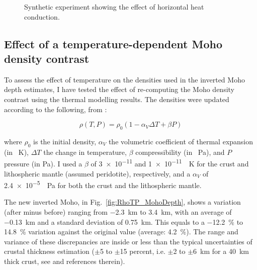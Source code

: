 \begin{subappendices}
\begin{figure}
	\begin{adjustbox}{center}
	\end{adjustbox}
	\caption[Synthetic experiment showing the effect of horizontal heat conduction.]{Synthetic experiment showing the effect of horizontal heat conduction.}
	\label{fig:2Deff}
\end{figure}

\FloatBarrier

\subsection{Effect of a temperature-dependent Moho density contrast}
\label{ss:ApplSup:MethodTests:MohoDeltaRho}

To assess the effect of temperature on the densities used in the inverted Moho depth estimates, I have tested the effect of re-computing the Moho density contrast using the thermal modelling results.
The densities were updated according to the following, from \textcite{allen2013basin}:

\begin{equation*}
    \rho(T,P) = \rho_0 (1 - \alpha_V \Delta T + \beta P) 
\end{equation*}

where $\rho_0$ is the initial density, $\alpha_V$ the volumetric coefficient of thermal expansion (in \si{\per \kelvin}), $\Delta T$ the change in temperature, $\beta$ compressibility (in \si{\per \pascal}), and $P$ pressure (in \si{\pascal}). I used a $\beta$ of \num{3e-11} and \SI{1e-11}{\per \kelvin} for the crust and lithospheric mantle (assumed peridotite), respectively, and a $\alpha_V$ of \SI{2.4e-5}{\per \pascal} for both the crust and the lithospheric mantle.

The new inverted Moho, in Fig.~\ref{fig:RhoTP_MohoDepth}, shows a variation (after minus before) ranging from \SI{-2.3}{\kilo \metre} to \SI[retain-explicit-plus]{+3.4}{\kilo \metre}, with an average of \SI{-0.13}{\kilo \metre} and a standard deviation of \SI{0.75}{\kilo \metre}.
This equals to a \SI{-12.2}{\percent} to \SI[retain-explicit-plus]{+14.8}{\percent} variation against the original value (average: \SI[retain-explicit-plus]{+4.2}{\percent}).
The range and variance of these discrepancies are inside or less than the typical uncertainties of crustal thickness estimation ($\pm$\num{5} to $\pm$\num{15} percent, i.e. $\pm$\num{2} to $\pm$\SI{6}{\kilo \metre} for a \SI{40}{\kilo \metre} thick crust, see \cite{Grad2009} and references therein).


\end{subappendices}
